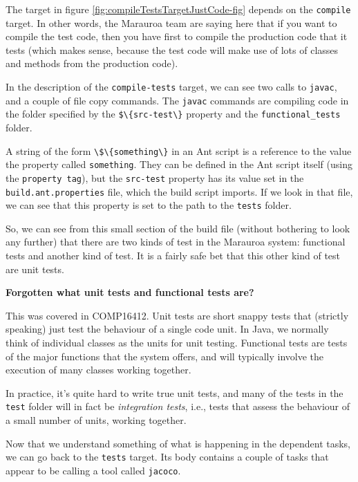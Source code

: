 \documentclass[
]{book}
\begin{document}
The target in figure \ref{fig:compileTestsTargetJustCode-fig} depends on the \texttt{compile} target. In other words, the Marauroa team are saying here that if you want to compile the test code, then you have first to compile the production code that it tests (which makes sense, because the test code will make use of lots of classes and methods from the production code).

In the description of the \texttt{compile-tests} target, we can see two calls to \texttt{javac}, and a couple of file copy commands. The \texttt{javac} commands are compiling code in the folder specified by the \texttt{\$\textbackslash{}\{src-test\textbackslash{}\}} property and the \texttt{functional\_tests} folder.

A string of the form \texttt{\textbackslash{}\$\textbackslash{}\{something\textbackslash{}\}} in an Ant script is a reference to the value the property called \texttt{something}. They can be defined in the Ant script itself (using the \texttt{property\ tag}), but the \texttt{src-test} property has its value set in the \texttt{build.ant.properties} file, which the build script imports. If we look in that file, we can see that this property is set to the path to the \texttt{tests} folder.

So, we can see from this small section of the build file (without bothering to look any further) that there are two kinds of test in the Marauroa system: functional tests and another kind of test. It is a fairly safe bet that this other kind of test are unit tests.

\textbf{Forgotten what unit tests and functional tests are?}

This was covered in COMP16412. Unit tests are short snappy tests that (strictly speaking) just test the behaviour of a single code unit. In Java, we normally think of individual classes as the units for unit testing. Functional tests are tests of the major functions that the system offers, and will typically involve the execution of many classes working together.

In practice, it's quite hard to write true unit tests, and many of the tests in the \texttt{test} folder will in fact be \emph{integration tests}, i.e., tests that assess the behaviour of a small number of units, working together.

Now that we understand something of what is happening in the dependent tasks, we can go back to the \texttt{tests} target. Its body contains a couple of tasks that appear to be calling a tool called \texttt{jacoco}.
\end{document}
